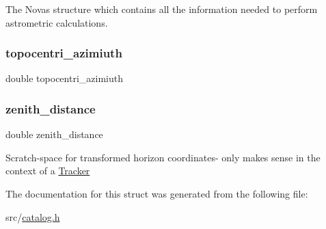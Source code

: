 The Novas structure which contains all the information needed to perform astrometric calculations. \mbox{\label{structentry__struct_ab14bfd72ae3d4f1e24e268c4383d4eb9}} 
\subsubsection{\texorpdfstring{topocentri\+\_\+azimiuth}{topocentri\_azimiuth}}
{\footnotesize\ttfamily double topocentri\+\_\+azimiuth}

\mbox{\label{structentry__struct_a3c2f9054e85abef611e387ff641fe831}} 
\subsubsection{\texorpdfstring{zenith\+\_\+distance}{zenith\_distance}}
{\footnotesize\ttfamily double zenith\+\_\+distance}

Scratch-\/space for transformed horizon coordinates-\/ only makes sense in the context of a \mbox{\hyperlink{struct_tracker}{Tracker}} 

The documentation for this struct was generated from the following file\+:\begin{DoxyCompactItemize}
\item 
src/\mbox{\hyperlink{catalog_8h}{catalog.\+h}}\end{DoxyCompactItemize}

